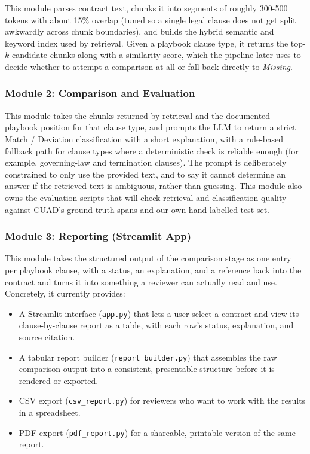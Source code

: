 \documentclass[11pt]{article}
\begin{document}
This module parses contract text, chunks it into segments of roughly
300-500 tokens with about 15\% overlap (tuned so a single legal clause
does not get split awkwardly across chunk boundaries), and builds the
hybrid semantic and keyword index used by retrieval. Given a playbook
clause type, it returns the top-$k$ candidate chunks along with a
similarity score, which the pipeline later uses to decide whether to
attempt a comparison at all or fall back directly to \emph{Missing}.

\subsubsection{Module 2: Comparison and Evaluation}

This module takes the chunks returned by retrieval and the documented
playbook position for that clause type, and prompts the LLM to return a
strict Match / Deviation classification with a short explanation, with
a rule-based fallback path for clause types where a deterministic check
is reliable enough (for example, governing-law and termination
clauses). The prompt is deliberately constrained to only use the
provided text, and to say it cannot determine an answer if the
retrieved text is ambiguous, rather than guessing. This module also
owns the evaluation scripts that will check retrieval and
classification quality against CUAD's ground-truth spans and our own
hand-labelled test set.

\subsubsection{Module 3: Reporting (Streamlit App)}

This module takes the structured output of the comparison stage
as one entry per playbook clause, with a status, an explanation, and a
reference back into the contract and turns it into something a
reviewer can actually read and use. Concretely, it currently provides:

\begin{itemize}
  \item A Streamlit interface (\texttt{app.py}) that lets a user select
    a contract and view its clause-by-clause report as a table, with
    each row's status, explanation, and source citation.
  \item A tabular report builder (\texttt{report\_builder.py}) that
    assembles the raw comparison output into a consistent, presentable
    structure before it is rendered or exported.
  \item CSV export (\texttt{csv\_report.py}) for reviewers who want to
    work with the results in a spreadsheet.
  \item PDF export (\texttt{pdf\_report.py}) for a shareable, printable
    version of the same report.
\end{itemize}
\end{document}

